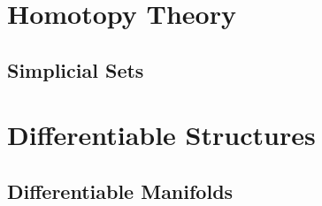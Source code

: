 

\part{Homotopy Theory}

\chapter{Simplicial Sets}



\part{Differentiable Structures}


% 
% 
% 
% 
% 


% 

\chapter{Differentiable Manifolds}




\backmatter

\printbibliography



